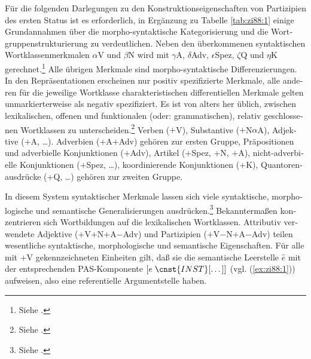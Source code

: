 \documentclass[output=paper,colorlinks,citecolor=brown, booklanguage=german]{langscibook}
\begin{document}
\begin{otherlanguage}{german}
Für die folgenden Darlegungen zu den Konstruktionseigenschaften von Partizipien des ersten Status ist es erforderlich, in Ergänzung zu Tabelle \ref{tab:zi88:1} einige Grund\-an\-nah\-men über die morpho-syntaktische Kategorisierung und die Wortgruppenstrukturierung zu verdeutlichen. Neben den überkommenen syntaktischen Wortklassenmerkmalen $\alpha$V und $\beta$N wird mit $\gamma$A, $\delta$Adv, $\epsilon$Spez, $\zeta$Q und $\eta$K gerechnet.\footnote{Siehe \citet{Zimmermann1988-druck,Zimmermann1987d}.} Alle übrigen Merkmale sind morpho-syntaktische Differenzierungen. In den Repräsentationen erscheinen nur positiv spezifizierte Merkmale, alle anderen für die jeweilige Wortklasse charakteristischen differentiellen Merkmale gelten unmarkierterweise als negativ spezifiziert. Es ist von alters her üblich, zwischen lexikalischen, offenen und funktionalen (oder: gram\-ma\-ti\-schen), re\-la\-tiv geschlossenen Wortklassen zu unterscheiden.\footnote{Siehe \citet{Emonds1985,Emonds1987,Chomsky1986,Fukui1986}.} Verben ($+$V), Substantive ($+$N$\alpha$A), Adjektive ($+$A, \dots). Adverbien ($+$A$+$Adv) gehören zur ersten Gruppe, Präpositionen und adverbielle Konjunktionen ($+$Adv), Artikel ($+$Spez, $+$N, $+$A), nicht-adverbielle Konjunktionen ($+$Spez, \dots), koordinierende Konjunktionen ($+$K), Quantorenausdrücke ($+$Q, \dots) gehören zur zweiten Gruppe.

\largerpage
In diesem System syntaktischer Merkmale lassen sich viele syn\-tak\-ti\-sche, morphologische und semantische Generalisierungen ausdrücken.\footnote{Siehe \citet{Zimmermann1985,Zimmermann1987a,Zimmermann1988-druck,Zimmermann1987d}.} Be\-kann\-ter\-ma\-ßen konzentrieren sich Wortbildungen auf die lexikalischen Wort\-klas\-sen. Attributiv verwendete Adjektive ($+$V$+$N$+$A$-$Adv) und Partizipien ($+$V$-$N$+$A$-$Adv) teilen wesentliche syntaktische, morphologische und se\-man\-ti\-sche Eigenschaften. Für alle mit $+$V gekennzeichneten Einheiten gilt, daß sie die semantische Leerstelle $\hat{e}$ mit der entsprechenden PAS-Komponente $[e\; \cnst{INST}[ \dots]]$ (vgl. (\ref{ex:zi88:1})) aufweisen, also eine referentielle Argumentstelle haben.


\end{otherlanguage}
\end{document}
